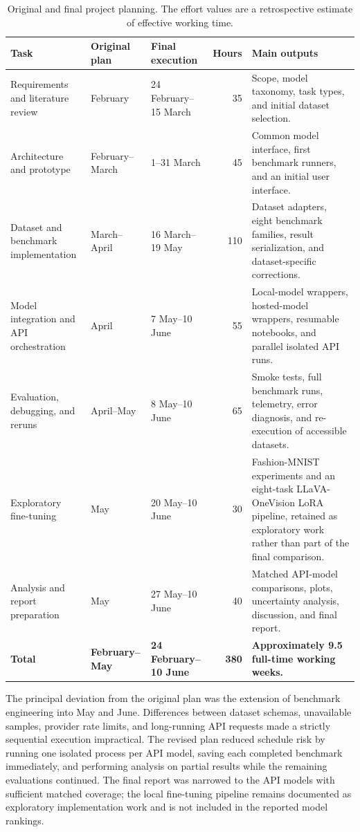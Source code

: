 ﻿\documentclass[11pt,a4paper]{article}
\begin{document}
\begin{table}[H]
\centering
\small
\caption{Original and final project planning. The effort values are a
retrospective estimate of effective working time.}
\label{tab:project-planning}
\begin{tabularx}{\textwidth}{@{}p{3.2cm}p{2.4cm}p{2.7cm}rX@{}}
\toprule
\textbf{Task} & \textbf{Original plan} & \textbf{Final execution} &
\textbf{Hours} & \textbf{Main outputs} \\
\midrule
Requirements and literature review
& February
& 24 February--15 March
& 35
& Scope, model taxonomy, task types, and initial dataset selection. \\

Architecture and prototype
& February--March
& 1--31 March
& 45
& Common model interface, first benchmark runners, and an initial user
interface. \\

Dataset and benchmark implementation
& March--April
& 16 March--19 May
& 110
& Dataset adapters, eight benchmark families, result serialization, and
dataset-specific corrections. \\

Model integration and API orchestration
& April
& 7 May--10 June
& 55
& Local-model wrappers, hosted-model wrappers, resumable notebooks, and
parallel isolated API runs. \\

Evaluation, debugging, and reruns
& April--May
& 8 May--10 June
& 65
& Smoke tests, full benchmark runs, telemetry, error diagnosis, and
re-execution of accessible datasets. \\

Exploratory fine-tuning
& May
& 20 May--10 June
& 30
& Fashion-MNIST experiments and an eight-task LLaVA-OneVision LoRA
pipeline, retained as exploratory work rather than part of the final
comparison. \\

Analysis and report preparation
& May
& 27 May--10 June
& 40
& Matched API-model comparisons, plots, uncertainty analysis, discussion,
and final report. \\
\midrule
\textbf{Total}
& \textbf{February--May}
& \textbf{24 February--10 June}
& \textbf{380}
& \textbf{Approximately 9.5 full-time working weeks.} \\
\bottomrule
\end{tabularx}
\end{table}

The principal deviation from the original plan was the extension of
benchmark engineering into May and June. Differences between dataset
schemas, unavailable samples, provider rate limits, and long-running API
requests made a strictly sequential execution impractical. The revised plan
reduced schedule risk by running one isolated process per API model, saving
each completed benchmark immediately, and performing analysis on partial
results while the remaining evaluations continued. The final report was
narrowed to the API models with sufficient matched coverage; the local
fine-tuning pipeline remains documented as exploratory implementation work
and is not included in the reported model rankings.
\end{document}
